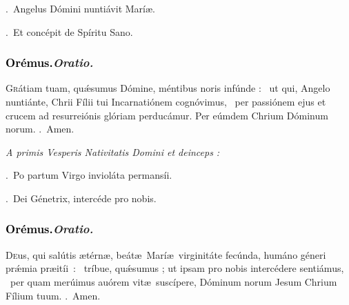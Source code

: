 \documentclass[12pt]{article} %
\newenvironment{rubric}{\color{benred8} \itshape \leftskip 0in \setlength{\parindent}{0.25in}}{\vspace{2 mm}}
\newenvironment{response}{\leftskip 0in \setlength{\parindent}{0in}}{\vspace{2 mm}}
\let\oldgresixstar\gresixstar
\renewcommand{\gresixstar}{\textcolor{benred8}{\oldgresixstar}}
\let\oldgredagger\gredagger
\renewcommand{\gredagger}{\textcolor{benred8}{\oldgredagger}}
\let\oldVbar\Vbar
\renewcommand{\Vbar}{\textcolor{benred8}{\oldVbar .}}
\let\oldRbar\Rbar
\renewcommand{\Rbar}{\textcolor{benred8}{\oldRbar .}}
\def\capitulumSpace{\hspace{20 mm}}
\begin{document}
\begin{response}
\Vbar\ Angelus D\'{o}mini nunti\'{a}vit Mar\'{i}\ae .

\Rbar\ Et conc\'{e}pit de Sp\'{i}ritu Sano.

\end{response}

\subsubsection*{\textcolor{black}{Or\'{e}mus.}\capitulumSpace \emph{Oratio.}}

\begin{response}\lettrine{G}{r}\'{a}tiam tuam, qu\'{\ae}sumus D\'{o}mine, m\'{e}ntibus noris inf\'{u}nde : \gredagger\ ut qui, Angelo nunti\'{a}nte, Chrii F\'{i}lii tui Incarnati\'{o}nem cogn\'{o}vimus, \gresixstar\ per passi\'{o}nem ejus et crucem ad resurrei\'{o}nis gl\'{o}riam perduc\'{a}mur. Per e\'{u}mdem Chrium D\'{o}minum norum. \Rbar\ Amen.

\end{response}

\begin{rubric}
A primis Vesperis Nativitatis Domini et deinceps :

\end{rubric}

\begin{response}
\Vbar\ Po partum Virgo inviol\'{a}ta permans\'{i}i.

\Rbar\ Dei G\'{e}netrix, interc\'{e}de pro nobis.

\end{response}

\subsubsection*{\textcolor{black}{Or\'{e}mus.}\capitulumSpace \emph{Oratio.}}

\begin{response}\lettrine{D}{e}us, qui sal\'{u}tis \ae t\'{e}rn\ae , be\'{a}t\ae\ Mar\'{i}\ae\ virginit\'{a}te fec\'{u}nda, hum\'{a}no g\'{e}neri pr\'{\ae}mia \mbox{pr\ae{}it\'{i}i : \gredagger} tr\'{i}bue, qu\'{\ae}sumus ; ut ipsam pro nobis interc\'{e}dere senti\'{a}mus, \gresixstar\ per quam mer\'{u}imus au\'{o}rem vit\ae\ susc\'{i}pere, D\'{o}minum norum Jesum Chrium F\'{i}lium tuum. \Rbar\ Amen.

\end{response}
\end{document}
